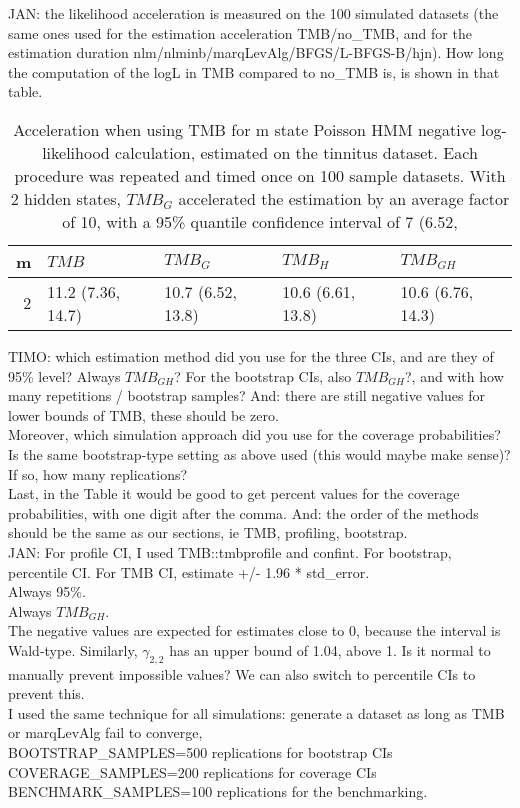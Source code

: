 \documentclass[bimj,fleqn]{w-art}\usepackage[]{graphicx}\usepackage[]{color}
\theoremstyle{plain}
\theoremstyle{definition}
\begin{document}
JAN: the likelihood acceleration is measured on the 100 simulated datasets (the same ones used for the estimation acceleration TMB/no\_TMB, and for the estimation duration nlm/nlminb/marqLevAlg/BFGS/L-BFGS-B/hjn).
How long the computation of the logL in TMB compared to no\_TMB is, is shown in that table.


\begin{table}[ht]
\centering
\begin{tabular}{rllll}
  \hline
m & \textit{${TMB}$} & \textit{${TMB_G}$} & \textit{${TMB_H}$} & \textit{${TMB_{GH}}$} \\ 
  \hline
2 & 11.2 (7.36, 14.7) & 10.7 (6.52, 13.8) & 10.6 (6.61, 13.8) & 10.6 (6.76, 14.3) \\ 
   \hline
\end{tabular}
\caption{Acceleration when using TMB for m state Poisson HMM negative log-likelihood calculation, estimated on the tinnitus dataset. Each procedure was repeated and timed once on 100 sample datasets. With 2 hidden states, $TMB_G$ accelerated the estimation by an average factor of 10, with a 95\% quantile confidence interval of 7 (6.52,} 
\label{table:speed-tinn-nll}
\end{table}


TIMO: which estimation method did you use for the three CIs, and are they of 95\% level? Always $TMB_{GH}$? For the bootstrap CIs, also $TMB_{GH}$?, and with how many repetitions / bootstrap samples? And: there are still negative values for lower bounds of TMB, these should be zero.\\
Moreover, which simulation approach did you use for the coverage probabilities? Is the same bootstrap-type setting as above used (this would maybe make sense)? If so, how many replications?\\
Last, in the Table it would be good to get percent values for the coverage probabilities, with one digit after the comma. And: the order of the methods should be the same as our sections, ie TMB, profiling, bootstrap.\\[1ex]

JAN: For profile CI, I used TMB::tmbprofile and confint. For bootstrap, percentile CI. For TMB CI, estimate +/- 1.96 * std\_error.\\
Always 95\%.\\
Always $TMB_{GH}$.\\
The negative values are expected for estimates close to 0, because the interval is Wald-type. Similarly, $\gamma_{2,2}$ has an upper bound of 1.04, above 1. Is it normal to manually prevent impossible values? We can also switch to percentile CIs to prevent this.\\
I used the same technique for all simulations: generate a dataset as long as TMB or marqLevAlg fail to converge,\\
BOOTSTRAP\_SAMPLES=500 replications for bootstrap CIs\\
COVERAGE\_SAMPLES=200 replications for coverage CIs\\
BENCHMARK\_SAMPLES=100 replications for the benchmarking.\\
\end{document}
